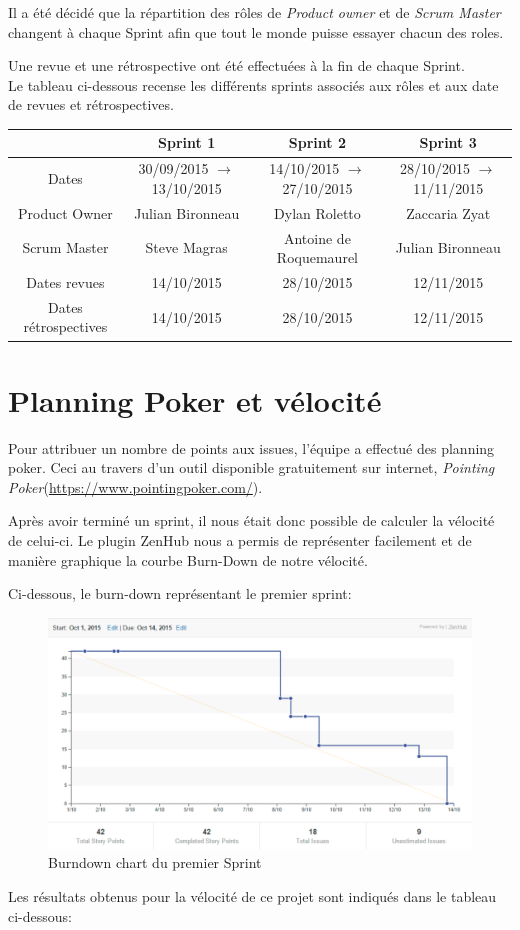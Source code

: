 \documentclass[12pt,a4paper,oneside]{book}
\begin{document}
	Il a été décidé que la répartition des rôles de \textit{Product owner }et de \textit{Scrum Master }changent à chaque Sprint afin que tout le monde puisse essayer chacun des roles.
	
	Une revue et une rétrospective ont été effectuées à la fin de chaque Sprint.\\
	Le tableau ci-dessous recense les différents sprints associés aux rôles et aux date de revues et rétrospectives.

	\hspace{-40px}
	\begin{tabular}{|c|c|c|c|}
		\hline
		& \textbf{Sprint 1 }& \textbf{Sprint 2 }& \textbf{Sprint 3}\\
		\hline
		Dates & 30/09/2015 $\rightarrow$ 13/10/2015 & 14/10/2015 $\rightarrow$ 27/10/2015 & 28/10/2015 $\rightarrow$ 11/11/2015\\
		\hline
		Product Owner & Julian Bironneau &Dylan Roletto& Zaccaria Zyat\\
		\hline
		Scrum Master & Steve Magras & Antoine de Roquemaurel &Julian Bironneau\\
		\hline
		Dates revues & 14/10/2015& 28/10/2015& 12/11/2015\\
		\hline
		Dates rétrospectives & 14/10/2015& 28/10/2015 &12/11/2015 \\
		\hline
	\end{tabular}
	
	\section{Planning Poker et vélocité}
	Pour attribuer un nombre de points aux issues, l'équipe a effectué des planning poker. Ceci au travers d'un outil disponible
	gratuitement sur internet, \textit{Pointing Poker}\newline (\url{https://www.pointingpoker.com/}).
	
	Après avoir terminé un sprint, il nous était donc possible de calculer la vélocité de celui-ci. Le plugin ZenHub nous a permis de représenter facilement et de manière graphique la courbe Burn-Down de notre vélocité. 
	
	Ci-dessous, le burn-down représentant le premier sprint:
	\begin{figure}[H]
		\includegraphics[width=18cm]{../beamer/images/Results/methodo/burndown.png}
		\caption{Burndown chart du premier Sprint}
	\end{figure}
	Les résultats obtenus pour la vélocité de ce projet sont indiqués dans le tableau ci-dessous:
\end{document}
